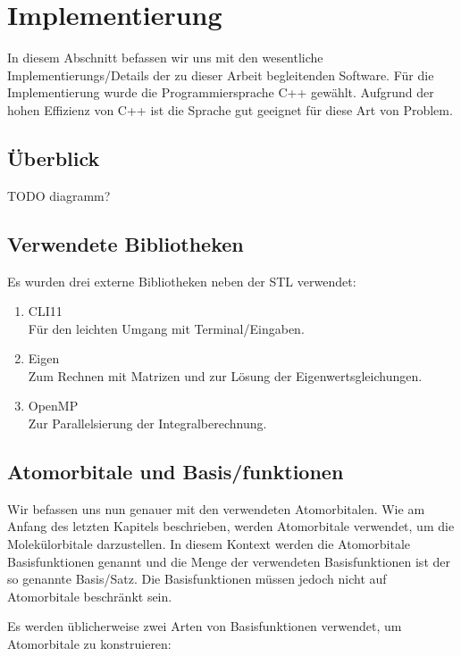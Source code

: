 \section{Implementierung}\label{implementation-section}
In diesem Abschnitt befassen wir uns mit den wesentliche Implementierungs\-/Details
der zu dieser Arbeit begleitenden Software. Für die Implementierung wurde
die Programmiersprache C++ gewählt. Aufgrund der hohen Effizienz von C++ ist die Sprache
gut geeignet für diese Art von Problem.

\subsection{Überblick}
 TODO diagramm?
\subsection{Verwendete Bibliotheken}
Es wurden drei externe Bibliotheken neben der STL verwendet:
\begin{enumerate}
    \item CLI11 \cite{cl11}\\
    Für den leichten Umgang mit Terminal\-/Eingaben.
    \item Eigen \cite{eigen}\\
    Zum Rechnen mit Matrizen und zur Lösung der Eigenwertsgleichungen.
    \item OpenMP \cite{omp}\\
    Zur Parallelsierung der Integralberechnung.
\end{enumerate}

\subsection{Atomorbitale und Basis\-/funktionen}\label{basis-functions-section}
Wir befassen uns nun genauer mit den verwendeten Atomorbitalen.
Wie am Anfang des letzten Kapitels beschrieben, werden Atomorbitale verwendet,
um die Molekülorbitale darzustellen. In diesem Kontext werden die Atomorbitale
Basisfunktionen genannt und die Menge der verwendeten Basisfunktionen
ist der so genannte Basis\-/Satz.
Die Basisfunktionen müssen jedoch nicht auf Atomorbitale beschränkt sein.
\cite[Ab. 5.3.1]{lewars_2016}

Es werden üblicherweise zwei Arten von Basisfunktionen verwendet,
um Atomorbitale zu konstruieren:

